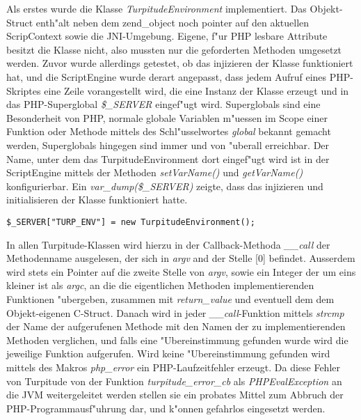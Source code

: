 Als erstes wurde die Klasse \emph{TurpitudeEnvironment} implementiert. Das Objekt-Struct enth"alt neben dem zend\_object noch pointer
auf den aktuellen ScripContext sowie die JNI-Umgebung. Eigene, f"ur PHP lesbare Attribute besitzt die Klasse nicht, also mussten
nur die geforderten Methoden umgesetzt werden. Zuvor wurde allerdings getestet, ob das injizieren der Klasse funktioniert hat, und die
ScriptEngine wurde derart angepasst, dass jedem Aufruf eines PHP-Skriptes eine Zeile vorangestellt wird, die eine Instanz der Klasse
erzeugt und in das PHP-Superglobal \emph{\$\_SERVER} eingef"ugt wird. Superglobals sind eine Besonderheit von PHP, normale globale
Variablen m"uessen im Scope einer Funktion oder Methode mittels des Schl"usselwortes \emph{global} bekannt gemacht werden, Superglobals
hingegen sind immer und von "uberall erreichbar. Der Name, unter dem das TurpitudeEnvironment dort eingef"ugt wird ist in der ScriptEngine
mittels der Methoden \emph{setVarName()} und \emph{getVarName()} konfigurierbar. Ein \emph{var\_dump(\$\_SERVER)} zeigte, dass das
injizieren und initialisieren der Klasse funktioniert hatte.
\begin{lstlisting}[caption=TurpitudeEnvironment in \$\_SERVER einf"ugen]
$_SERVER["TURP_ENV"] = new TurpitudeEnvironment();
\end{lstlisting}
In allen Turpitude-Klassen wird hierzu in der Callback-Methoda \emph{\_\_call} der 
Methodenname ausgelesen, der sich in \emph{argv} and der Stelle [0] befindet. Ausserdem wird stets ein Pointer auf die zweite Stelle
von \emph{argv}, sowie ein Integer der um eins kleiner ist als \emph{argc}, an die die eigentlichen
Methoden implementierenden Funktionen "ubergeben, zusammen mit \emph{return\_value} und eventuell dem dem Objekt-eigenen C-Struct.
Danach wird in jeder \emph{\_\_call}-Funktion mittels \emph{strcmp} der Name der aufgerufenen Methode mit den Namen der zu implementierenden 
Methoden verglichen, und falls eine "Ubereinstimmung gefunden wurde wird die jeweilige Funktion aufgerufen. Wird keine "Ubereinstimmung
gefunden wird mittels des Makros \emph{php\_error} ein PHP-Laufzeitfehler erzeugt. Da diese Fehler von Turpitude von der Funktion
\emph{turpitude\_error\_cb} als \emph{PHPEvalException} an die JVM weitergeleitet werden stellen sie ein probates Mittel zum Abbruch
der PHP-Programmausf"uhrung dar, und k"onnen gefahrlos eingesetzt werden.


